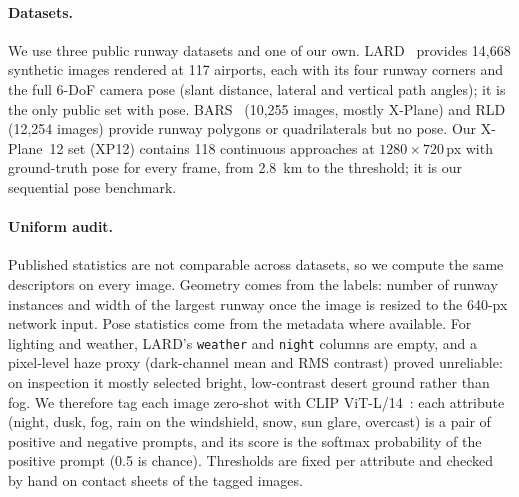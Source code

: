 \paragraph{Datasets.}
We use three public runway datasets and one of our own.
LARD~\cite{lard} provides 14{,}668 synthetic images rendered at 117 airports, each with its four runway corners and the full 6-DoF camera pose (slant distance, lateral and vertical path angles); it is the only public set with pose.
BARS~\cite{bars} (10{,}255 images, mostly X-Plane) and RLD (12{,}254 images) provide runway polygons or quadrilaterals but no pose.
Our X-Plane~12 set (XP12) contains 118 continuous approaches at $1280\times720$\,px with ground-truth pose for every frame, from \SI{2.8}{km} to the threshold; it is our sequential pose benchmark.

\paragraph{Uniform audit.}
Published statistics are not comparable across datasets, so we compute the same descriptors on every image.
Geometry comes from the labels: number of runway instances and width of the largest runway once the image is resized to the 640-px network input.
Pose statistics come from the metadata where available.
For lighting and weather, LARD's \texttt{weather} and \texttt{night} columns are empty, and a pixel-level haze proxy (dark-channel mean and RMS contrast) proved unreliable: on inspection it mostly selected bright, low-contrast desert ground rather than fog.
We therefore tag each image zero-shot with CLIP ViT-L/14~\cite{clip}: each attribute (night, dusk, fog, rain on the windshield, snow, sun glare, overcast) is a pair of positive and negative prompts, and its score is the softmax probability of the positive prompt (0.5 is chance).
Thresholds are fixed per attribute and checked by hand on contact sheets of the tagged images.


